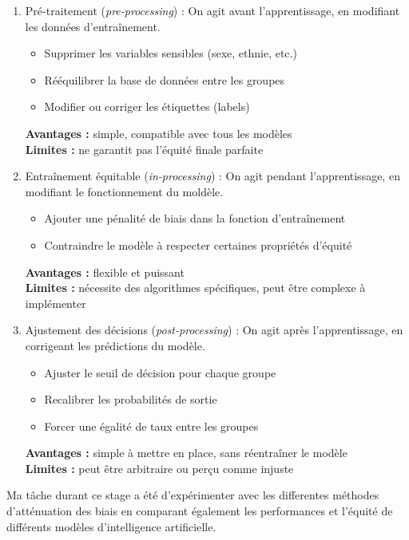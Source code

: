 \documentclass[12pt, letterpaper]{article}
\begin{document}
\begin{enumerate}
    \item Pré-traitement (\emph{pre-processing}) :
    On agit avant l'apprentissage, en modifiant les données d'entraînement.
    \begin{itemize}
        \item Supprimer les variables sensibles (sexe, ethnie, etc.)
        \item Rééquilibrer la base de données entre les groupes
        \item Modifier ou corriger les étiquettes (labels)
    \end{itemize}
    \textbf{Avantages :} simple, compatible avec tous les modèles \\
    \textbf{Limites :} ne garantit pas l'équité finale parfaite

    \item Entraînement équitable (\emph{in-processing}) : On agit pendant l'apprentissage, en modifiant le fonctionnement du moldèle.
    \begin{itemize}
        \item Ajouter une pénalité de biais dans la fonction d'entraînement
        \item Contraindre le modèle à respecter certaines propriétés d'équité
    \end{itemize}
    \textbf{Avantages :} flexible et puissant \\
    \textbf{Limites :} nécessite des algorithmes spécifiques, peut être complexe à implémenter

    \item Ajustement des décisions (\emph{post-processing}) : On agit après l'apprentissage, en corrigeant les prédictions du modèle.
    \begin{itemize}
        \item Ajuster le seuil de décision pour chaque groupe
        \item Recalibrer les probabilités de sortie
        \item Forcer une égalité de taux entre les groupes
    \end{itemize}
    \textbf{Avantages :} simple à mettre en place, sans réentraîner le modèle \\
    \textbf{Limites :} peut être arbitraire ou perçu comme injuste

\end{enumerate}

Ma tâche durant ce stage a été d'expérimenter avec les differentes méthodes d'atténuation des biais en comparant également les performances et l'équité de différents modèles d'intelligence artificielle.
\end{document}
